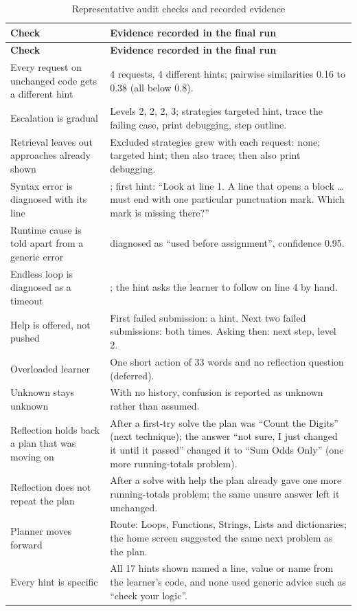 \begingroup\small
\setlength{\tabcolsep}{4pt}\renewcommand{\arraystretch}{1.15}
\begin{longtable}{|R{5.2cm}|R{8.4cm}|}
\caption{Representative audit checks and recorded evidence}\label{tab:audit}\\\hline
\textbf{Check} & \textbf{Evidence recorded in the final run}\\\hline\endfirsthead
\hline\textbf{Check} & \textbf{Evidence recorded in the final run}\\\hline\endhead
Every request on unchanged code gets a different hint & 4 requests, 4 different hints; pairwise similarities 0.16 to 0.38 (all below 0.8).\\\hline
Escalation is gradual & Levels 2, 2, 2, 3; strategies targeted hint, trace the failing case, print debugging, step outline.\\\hline
Retrieval leaves out approaches already shown & Excluded strategies grew with each request: none; targeted hint; then also trace; then also print debugging.\\\hline
Syntax error is diagnosed with its line & ; first hint: ``Look at line 1. A line that opens a block \ldots{} must end with one particular punctuation mark. Which mark is missing there?''\\\hline
Runtime cause is told apart from a generic error &  diagnosed as ``used before assignment'', confidence 0.95.\\\hline
Endless loop is diagnosed as a timeout & ; the hint asks the learner to follow  on line 4 by hand.\\\hline
Help is offered, not pushed & First failed submission: a hint. Next two failed submissions:  both times. Asking then: next step, level 2.\\\hline
Overloaded learner & One short action of 33 words and no reflection question (deferred).\\\hline
Unknown stays unknown & With no history, confusion is reported as unknown rather than assumed.\\\hline
Reflection holds back a plan that was moving on & After a first-try solve the plan was ``Count the Digits'' (next technique); the answer ``not sure, I just changed it until it passed'' changed it to ``Sum Odds Only'' (one more running-totals problem).\\\hline
Reflection does not repeat the plan & After a solve with help the plan already gave one more running-totals problem; the same unsure answer left it unchanged.\\\hline
Planner moves forward & Route: Loops, Functions, Strings, Lists and dictionaries; the home screen suggested the same next problem as the plan.\\\hline
Every hint is specific & All 17 hints shown named a line, value or name from the learner's code, and none used generic advice such as ``check your logic''.\\\hline
\end{longtable}
\endgroup

